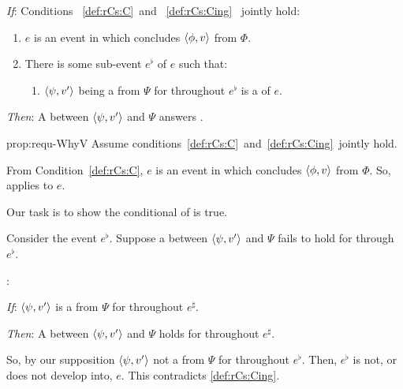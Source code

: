 \begin{note}
  \begin{proposition}
    \label{prop:requ-WhyV}
    \vspace{-\baselineskip}
    \begin{itenum}
    \item[\emph{If}:]
      Conditions~%
      \ref{def:rCs:C}~and~%
      \ref{def:rCs:Cing}~%
      jointly hold:
      \begin{enumerate}[label=\arabic*., ref=(\arabic*)]
      \item
        \label{def:rCs:C}
        \(e\) is an event in which \vAgent{} concludes \(\langle \phi, v \rangle\) from \(\Phi\).
      \item
        \label{def:rCs:Cing}
        There is some sub-event \(e^{\flat}\) of \(e\) such that:
        \begin{enumerate}[label=\alph*., ref=(\arabic{enumi}\alph*)]
        \item
          \label{def:rCs:Cing:requ}
          \(\langle \psi, v' \rangle\) being a \fc{} from \(\Psi\) for \vAgent{} throughout \(e^{\flat}\) is a \requ{} of \(e\).
        \end{enumerate}
      \end{enumerate}
    \item[\emph{Then}:]
      A  between \(\langle \psi, v' \rangle\) and \(\Psi\) answers \qWhyV{}.
    \end{itenum}
    \vspace{-\baselineskip}
  \end{proposition}

  \begin{argument}{prop:requ-WhyV}
    Assume conditions~\ref{def:rCs:C}~and~\ref{def:rCs:Cing}~jointly hold.

    From Condition~\ref{def:rCs:C}, \(e\) is an event in which \vAgent{} concludes \(\langle \phi, v \rangle\) from \(\Phi\).
    So, \qWhyV{} applies to \(e\).

    Our task is to show the conditional of \qWhyV{} is true.

    Consider the event \(e^{\flat}\).
    Suppose a \ros{} between \(\langle \psi, v' \rangle\) and \(\Psi\) fails to hold for \vAgent{} through \(e^{\flat}\).

    \supportII{}:

    \begin{itenum}
    \item[\emph{If}:]
      \(\langle \psi, v' \rangle\) is a  from \(\Psi\) for \vAgent{} throughout \(e^{\sharp}\).
    \item[\emph{Then}:]
      A  between \(\langle \psi, v' \rangle\) and \(\Psi\) holds for \vAgent{} throughout \(e^{\sharp}\).
    \end{itenum}

    \noindent%
    So, by our supposition \(\langle \psi, v' \rangle\) not a  from \(\Psi\) for \vAgent{} throughout \(e^{\flat}\).
    Then, \(e^{\flat}\) is not, or does not develop into, \(e\).
    This contradicts  \ref{def:rCs:Cing}.
  \end{argument}
\end{note}

